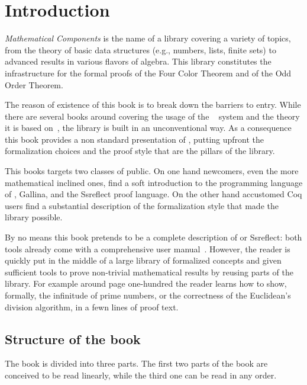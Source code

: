 \setcounter{chapter}{-1}
\chapter{Introduction}

\emph{Mathematical Components}
is the name of a \Coq{} library covering a variety of
topics, from the theory of basic data structures (e.g., numbers, lists, finite
sets) to advanced results in various flavors of algebra. This library
constitutes the infrastructure for the formal proofs of the Four Color Theorem
and of the Odd Order Theorem.

The reason of existence of this book is to break down the barriers to entry.
While there are several books around covering the usage of the 
\Coq{}~\cite{BC04,SF,CPDT}
system and the theory it is based on~\cite[Chapter 4]{Coq:manual}\cite{paulinmohring:hal-01094195,hottbook}, 
the \mcbMC{} library is built
in an unconventional way.  As a consequence this book provides a non
standard presentation of \Coq{}, putting upfront the formalization choices
and the proof style that are the pillars of the library.

This books targets two classes of public.  On one hand newcomers, even the 
more mathematical inclined ones, find a soft introduction to the programming
language of \Coq{}, Gallina, and the Ssreflect proof language.
On the other hand accustomed Coq users find a substantial description
of the formalization style that made the \mcbMC{} library possible.

By no means this book pretends to be a complete description of \Coq{} or
Ssreflect: both tools already come with a comprehensive user 
manual~\cite{Coq:manual,ssrman}.
However, the reader is quickly put in the middle of a large library
of formalized concepts and given sufficient tools to prove non-trivial
mathematical results by reusing parts of the library.  
For example around page one-hundred the reader learns
how to show, formally, the infinitude of prime numbers, or the correctness of
the Euclidean's division algorithm, in a fewn lines of proof text.

\section{Structure of the book}

The book is divided into three parts.
The first two parts of the book are conceived to be read linearly,
while the third one can be read in any order.

